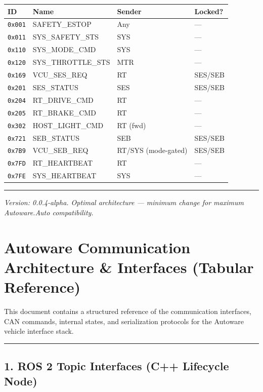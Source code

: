 \documentclass[12pt,a4paper,oneside]{report}
\begin{document}
\begin{longtable}[]{@{}llll@{}}
\toprule\noalign{}
ID & Name & Sender & Locked? \\
\midrule\noalign{}
\endhead
\bottomrule\noalign{}
\endlastfoot
\texttt{0x001} & SAFETY\_ESTOP & Any & --- \\
\texttt{0x011} & SYS\_SAFETY\_STS & SYS & --- \\
\texttt{0x110} & SYS\_MODE\_CMD & SYS & --- \\
\texttt{0x120} & SYS\_THROTTLE\_STS & MTR & --- \\
\texttt{0x169} & VCU\_SES\_REQ & RT & SES/SEB \\
\texttt{0x201} & SES\_STATUS & SES & SES/SEB \\
\texttt{0x204} & RT\_DRIVE\_CMD & RT & --- \\
\texttt{0x205} & RT\_BRAKE\_CMD & RT & --- \\
\texttt{0x302} & HOST\_LIGHT\_CMD & RT (fwd) & --- \\
\texttt{0x721} & SEB\_STATUS & SEB & SES/SEB \\
\texttt{0x7B9} & VCU\_SEB\_REQ & RT/SYS (mode-gated) & SES/SEB \\
\texttt{0x7FD} & RT\_HEARTBEAT & RT & --- \\
\texttt{0x7FE} & SYS\_HEARTBEAT & SYS & --- \\
\end{longtable}

\begin{center}\rule{0.5\linewidth}{0.5pt}\end{center}

\emph{Version: 0.0.4-alpha. Optimal architecture --- minimum change for maximum
Autoware.Auto compatibility.}


\chapter{Autoware Communication Architecture \& Interfaces (Tabular
Reference)}\label{autoware-communication-architecture-interfaces-tabular-reference}

This document contains a structured reference of the communication interfaces,
CAN commands, internal states, and serialization protocols for the Autoware
vehicle interface stack.

\begin{center}\rule{0.5\linewidth}{0.5pt}\end{center}

\section{1. ROS 2 Topic Interfaces (C++ Lifecycle
Node)}\label{ros-2-topic-interfaces-c-lifecycle-node}
\end{document}
